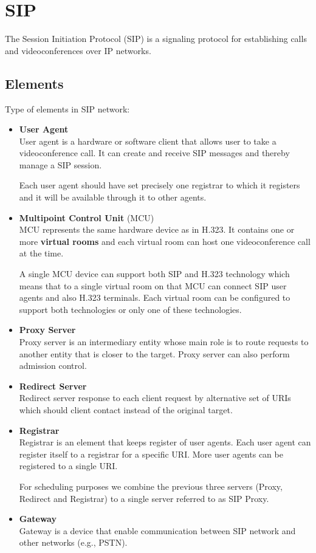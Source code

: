 \section{SIP}

The Session Initiation Protocol (SIP) is a signaling protocol for establishing 
calls and videoconferences over IP networks.

\subsection{Elements}

Type of elements in SIP network:

\begin{itemize}
\item \textbf{User Agent} \\
User agent is a hardware or software client that allows user to take a 
videoconference call. It can create and receive SIP messages and thereby
manage a SIP session.

Each user agent should have set precisely one registrar to which it registers 
and it will be available through it to other agents.

\item \textbf{Multipoint Control Unit} (MCU) \\
MCU represents the same hardware device as in H.323. It contains one or more 
\textbf{virtual rooms} and each virtual room can host one videoconference call 
at the time.

A single MCU device can support both SIP and H.323 technology which means that 
to a single virtual room on that MCU can connect SIP user agents and also 
H.323 terminals. Each virtual room can be configured to support both 
technologies or only one of these technologies.

\item \textbf{Proxy Server} \\
Proxy server is an intermediary entity whose main role is to route requests to 
another entity that is closer to the target. Proxy server can also perform 
admission control.

\item \textbf{Redirect Server} \\
Redirect server response to each client request by alternative set of URIs 
which should client contact instead of the original target.

\item \textbf{Registrar} \\
Registrar is an element that keeps register of user agents. Each user agent 
can register itself to a registrar for a specific URI. More user agents can be 
registered to a single URI. 

For scheduling purposes we combine the previous three servers (Proxy, Redirect 
and Registrar) to a single server referred to as SIP Proxy.

\item \textbf{Gateway} \\
Gateway is a device that enable communication between SIP network and other 
networks (e.g., PSTN).
\end{itemize}

